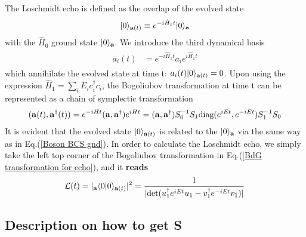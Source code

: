 The Loschmidt echo is defined as the overlap of the evolved state
\begin{eqnarray}\begin{aligned}
|0\rangle_{{\bf a}(t)}\equiv e^{-i\hat{H}_1t}|0\rangle_{\bf a}
\end{aligned}\end{eqnarray}
with the $\hat{H}_0$ ground state $|0\rangle_{\bf a}$. We introduce the third dynamical basis
\begin{eqnarray}\begin{aligned}
a_i(t)&=e^{-i\hat{H}_1t}a_ie^{i\hat{H}_1t}
\end{aligned}\end{eqnarray}
which annihilate the evolved state at time t: $a_i(t)|0\rangle_{{\bf a}(t)}=0$. Upon using the expression $\hat{H}_1=\sum_iE_ic_i^\dagger c_i$, the Bogoliubov transformation at time t can be represented as a chain of symplectic transformation
\begin{eqnarray}\begin{aligned}
\label{BdG transformation for echo}
({\bf a}(t),{\bf a}^\dagger(t))=e^{-iHt}
({\bf a} , {\bf a}^\dagger)e^{iHt}=({\bf a},{\bf a}^\dagger)S_0^{-1}S_1\text{diag}(e^{iEt},e^{-iEt})S_1^{-1}S_0
\end{aligned}\end{eqnarray}
It is evident that the evolved state $|0\rangle_{{\bf a}(t)}$ is related to the $|0\rangle_{{\bf a}}$ via the same way as in Eq.(\ref{Boson BCS gnd}). In order to calculate the Loschmidt echo, we simply take the left top corner of the Bogoliubov transformation in Eq.(\ref{BdG transformation for echo}), and it {\bf\color{red}reads}
\begin{eqnarray}\begin{aligned}
\mathcal{L}(t)=|_{\bf a}\langle0|0\rangle_{{\bf a}(t)}|^2=\frac{1}{|\text{det}(u_1^\dagger e^{iEt}u_1-v_1^\dagger e^{-iEt}v_1)|}
\end{aligned}\end{eqnarray}

\subsection{Description on how to get S}

